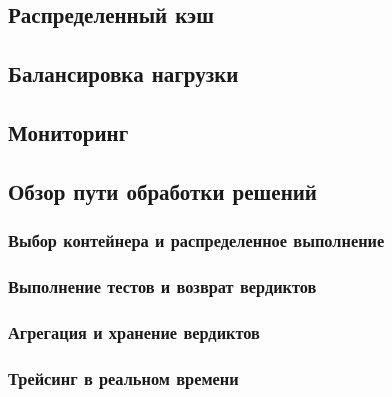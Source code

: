 \subsection{Распределенный кэш}

\subsection{Балансировка нагрузки}

\subsection{Мониторинг}



\subsection{Обзор пути обработки решений}

\subsubsection{Выбор контейнера и распределенное выполнение}

\subsubsection{Выполнение тестов и возврат вердиктов}

\subsubsection{Агрегация и хранение вердиктов}

\subsubsection{Трейсинг в реальном времени}


